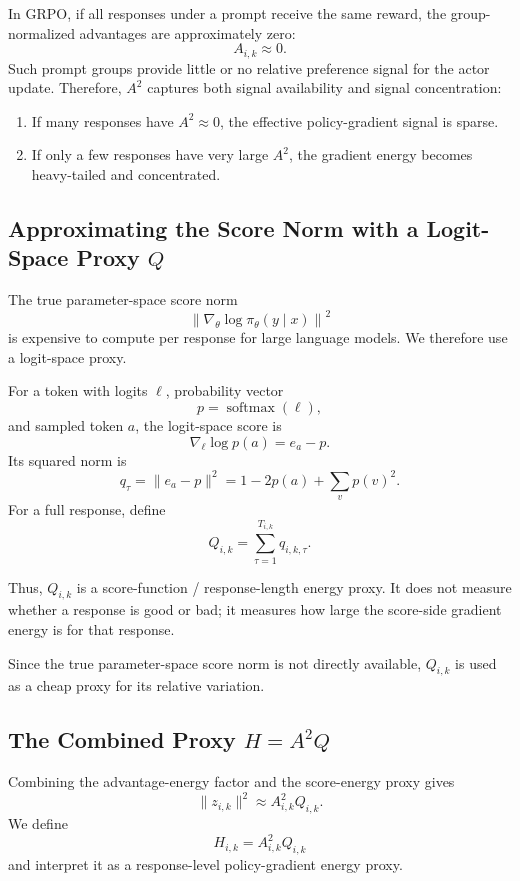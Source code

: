 \documentclass[11pt,a4paper]{article}
\begin{document}
In GRPO, if all responses under a prompt receive the same reward, the group-normalized advantages are approximately zero:
\[
A_{i,k}\approx 0.
\]
Such prompt groups provide little or no relative preference signal for the actor update. Therefore, \(A^2\) captures both signal availability and signal concentration:
\begin{enumerate}[leftmargin=2em]
    \item If many responses have \(A^2\approx 0\), the effective policy-gradient signal is sparse.
    \item If only a few responses have very large \(A^2\), the gradient energy becomes heavy-tailed and concentrated.
\end{enumerate}

\subsection{Approximating the Score Norm with a Logit-Space Proxy \(Q\)}

The true parameter-space score norm
\[
\left\|
\nabla_\theta\log\pi_\theta(y\mid x)
\right\|^2
\]
is expensive to compute per response for large language models. We therefore use a logit-space proxy.

For a token with logits \(\ell\), probability vector
\[
p=\operatorname{softmax}(\ell),
\]
and sampled token \(a\), the logit-space score is
\[
\nabla_\ell \log p(a)=e_a-p.
\]
Its squared norm is
\[
q_\tau
=
\|e_a-p\|^2
=
1-2p(a)+\sum_v p(v)^2.
\]
For a full response, define
\[
Q_{i,k}
=
\sum_{\tau=1}^{T_{i,k}}
q_{i,k,\tau}.
\]

Thus, \(Q_{i,k}\) is a score-function / response-length energy proxy. It does not measure whether a response is good or bad; it measures how large the score-side gradient energy is for that response.

Since the true parameter-space score norm is not directly available, \(Q_{i,k}\) is used as a cheap proxy for its relative variation.

\subsection{The Combined Proxy \(H=A^2Q\)}

Combining the advantage-energy factor and the score-energy proxy gives
\[
\|z_{i,k}\|^2
\approx
A_{i,k}^2Q_{i,k}.
\]
We define
\[
\boxed{
H_{i,k}=A_{i,k}^2Q_{i,k}
}
\]
and interpret it as a response-level policy-gradient energy proxy.
\end{document}
